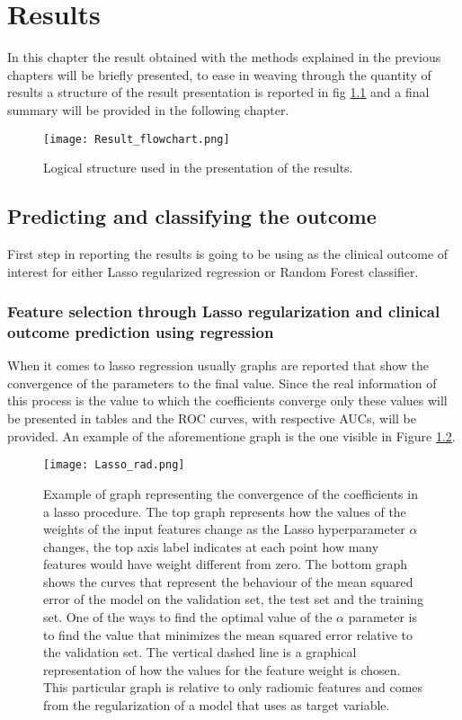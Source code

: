 \chapter{Results}
In this chapter the result obtained with the methods explained in the previous chapters will be briefly presented, to ease in weaving through the quantity of results a structure of the result presentation is reported in fig \ref{ResultFlowchart} and a final summary will be provided in the following chapter.

\begin{figure}[htbp]
  		\texttt{[image: Result\_flowchart.png]}
        \caption{Logical structure used in the presentation of the results.\label{ResultFlowchart}}
\end{figure}

\section{Predicting and classifying the outcome \death}
First step in reporting the results is going to be using \death as the clinical outcome of interest for either Lasso regularized regression or Random Forest classifier.

\subsection{Feature selection through Lasso regularization and clinical outcome prediction using regression}
When it comes to lasso regression usually graphs are reported that show the convergence of the parameters to the final value. Since the real information of this process is the value to which the coefficients converge only these values will be presented in tables and the ROC curves, with respective AUCs, will be provided. An example of the aforementione graph is the one visible in Figure \ref{LassoParam}.


\begin{figure}[htbp]
  		\texttt{[image: Lasso\_rad.png]}
        \caption{Example of graph representing the convergence of the coefficients in a lasso procedure. The top graph represents how the values of the weights of the input features change as the Lasso hyperparameter $\alpha$ changes, the top axis label indicates at each point how many features would have weight different from zero. The bottom graph shows the curves that represent the behaviour of the mean squared error of the model on the validation set, the test set and the training set. One of the ways to find the optimal value of the $\alpha$ parameter is to find the value that minimizes the mean squared error relative to the validation set. The vertical dashed line is a graphical representation of how the values for the feature weight is chosen. This particular graph is relative to only radiomic features and comes from the regularization of a model that uses \death as target variable.\label{LassoParam}}
\end{figure}

